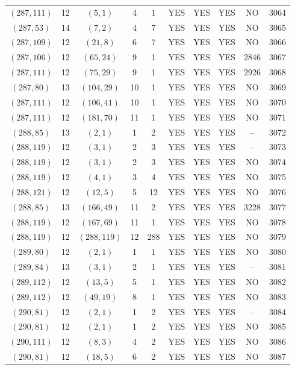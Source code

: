 \begin{longtable}{|c|c|c|c|c|c|c|c|c|c|}
$(287, 111)$ & 12 & $(5, 1)$ & 4 & 1 & YES & YES & YES & NO & 3064\\
$(287, 53)$ & 14 & $(7, 2)$ & 4 & 7 & YES & YES & YES & NO & 3065\\
$(287, 109)$ & 12 & $(21, 8)$ & 6 & 7 & YES & YES & YES & NO & 3066\\
$(287, 106)$ & 12 & $(65, 24)$ & 9 & 1 & YES & YES & YES & 2846 & 3067\\
$(287, 111)$ & 12 & $(75, 29)$ & 9 & 1 & YES & YES & YES & 2926 & 3068\\
$(287, 80)$ & 13 & $(104, 29)$ & 10 & 1 & YES & YES & YES & NO & 3069\\
$(287, 111)$ & 12 & $(106, 41)$ & 10 & 1 & YES & YES & YES & NO & 3070\\
$(287, 111)$ & 12 & $(181, 70)$ & 11 & 1 & YES & YES & YES & NO & 3071\\
$(288, 85)$ & 13 & $(2, 1)$ & 1 & 2 & YES & YES & YES & -- & 3072\\
$(288, 119)$ & 12 & $(3, 1)$ & 2 & 3 & YES & YES & YES & -- & 3073\\
$(288, 119)$ & 12 & $(3, 1)$ & 2 & 3 & YES & YES & YES & NO & 3074\\
$(288, 119)$ & 12 & $(4, 1)$ & 3 & 4 & YES & YES & YES & NO & 3075\\
$(288, 121)$ & 12 & $(12, 5)$ & 5 & 12 & YES & YES & YES & NO & 3076\\
$(288, 85)$ & 13 & $(166, 49)$ & 11 & 2 & YES & YES & YES & 3228 & 3077\\
$(288, 119)$ & 12 & $(167, 69)$ & 11 & 1 & YES & YES & YES & NO & 3078\\
$(288, 119)$ & 12 & $(288, 119)$ & 12 & 288 & YES & YES & YES & NO & 3079\\
$(289, 80)$ & 12 & $(2, 1)$ & 1 & 1 & YES & YES & YES & NO & 3080\\
$(289, 84)$ & 13 & $(3, 1)$ & 2 & 1 & YES & YES & YES & -- & 3081\\
$(289, 112)$ & 12 & $(13, 5)$ & 5 & 1 & YES & YES & YES & NO & 3082\\
$(289, 112)$ & 12 & $(49, 19)$ & 8 & 1 & YES & YES & YES & NO & 3083\\
$(290, 81)$ & 12 & $(2, 1)$ & 1 & 2 & YES & YES & YES & -- & 3084\\
$(290, 81)$ & 12 & $(2, 1)$ & 1 & 2 & YES & YES & YES & NO & 3085\\
$(290, 111)$ & 12 & $(8, 3)$ & 4 & 2 & YES & YES & YES & NO & 3086\\
$(290, 81)$ & 12 & $(18, 5)$ & 6 & 2 & YES & YES & YES & NO & 3087\\

\end{longtable}
